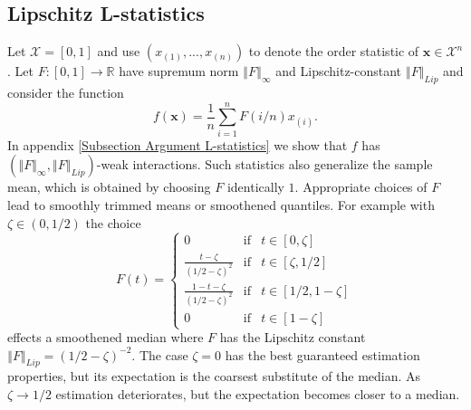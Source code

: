 \documentclass[final,12pt]{colt2018} %
\begin{document}
					\subsection{Lipschitz L-statistics\label{Subsection Lipschitz L-statistics}}
					
					Let $\mathcal{X}=\left[ 0,1\right] $ and use $\left( x_{\left( 1\right)
					},...,x_{\left( n\right) }\right) $ to denote the order statistic of $%
					\mathbf{x\in }\mathcal{X}^{n}$. Let $F:\left[ 0,1\right] \rightarrow 
					\mathbb{R}
					$ have supremum norm $\left\Vert F\right\Vert _{\infty }$ and
					Lipschitz-constant $\left\Vert F\right\Vert _{Lip}$ and consider the function%
					\begin{equation}
					f\left( \mathbf{x}\right) =\frac{1}{n}\sum_{i=1}^{n}F\left( i/n\right)
					x_{\left( i\right) }\text{.}  \label{L-statistic}
					\end{equation}%
					In appendix \ref{Subsection Argument L-statistics} we show that $f$ has $\left( \left\Vert F\right\Vert _{\infty },\left\Vert
					F\right\Vert _{Lip}\right) $-weak interactions. \newline
					Such statistics also generalize the sample mean, which is obtained by
					choosing $F$ identically $1$. Appropriate choices of $F$ lead to smoothly
					trimmed means or smoothened quantiles. For example with $\zeta \in \left(
					0,1/2\right) $ the choice 
					\begin{equation*}
					F\left( t\right) =\left\{ 
					\begin{array}{ccc}
					0 & \text{if} & t\in \left[ 0,\zeta \right] \\ 
					\frac{t-\zeta }{\left( 1/2-\zeta \right) ^{2}} & \text{if} & t\in \left[
					\zeta ,1/2\right] \\ 
					\frac{1-t-\zeta }{\left( 1/2-\zeta \right) ^{2}} & \text{if} & t\in \left[
					1/2,1-\zeta \right] \\ 
					0 & \text{if} & t\in \left[ 1-\zeta \right]%
					\end{array}%
					\right. 
					\end{equation*}%
					effects a smoothened median where $F$ has the Lipschitz constant $\left\Vert
					F\right\Vert _{Lip}=\left( 1/2-\zeta \right) ^{-2}$. The case $\zeta =0$ has the best guaranteed
					estimation properties, but its expectation is the coarsest substitute of the
					median. As $\zeta \rightarrow 1/2$ estimation deteriorates, but the expectation becomes closer to a median.
					
\end{document}
